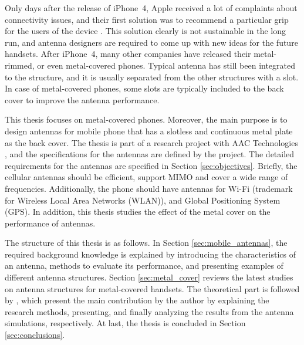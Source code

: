 Only days after the release of iPhone~4, Apple received a lot of complaints about connectivity issues, and their first solution was to recommend a particular grip for the users of the device \cite{apple_press,apple_bbc}. This solution clearly is not sustainable in the long run, and antenna designers are required to come up with new ideas for the future handsets. After iPhone~4, many other companies have released their metal-rimmed, or even metal-covered phones. Typical antenna has still been integrated to the structure, and it is usually separated from the other structures with a slot. In case of metal-covered phones, some slots are typically included to the back cover to improve the antenna performance. 

This thesis focuses on metal-covered phones. Moreover, the main purpose is to design antennas for mobile phone that has a slotless and continuous metal plate as the back cover. The thesis is part of a research project with AAC Technologies \cite{aac}, and the specifications for the antennas are defined by the project. The detailed requirements for the antennas are specified in Section \ref{sec:objectives}. Briefly, the cellular antennas should be efficient, support MIMO and cover a wide range of frequencies. Additionally, the phone should have antennas for Wi-Fi (trademark for Wireless Local Area Networks (WLAN)), and Global Positioning System (GPS). In addition, this thesis studies the effect of the metal cover on the performance of antennas.

The structure of this thesis is as follows. In Section \ref{sec:mobile_antennas}, the required background knowledge is explained by introducing the characteristics of an antenna, methods to evaluate its performance, and presenting examples of different antenna structures. Section \ref{sec:metal_cover} reviews the latest studies on antenna structures for metal-covered handsets. The theoretical part is followed by , which present the main contribution by the author by explaining the research methods, presenting, and finally analyzing the results from the antenna simulations, respectively. At last, the thesis is concluded in Section \ref{sec:conclusions}.

\clearpage
